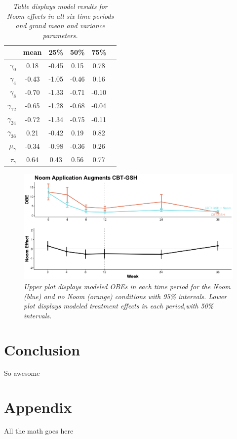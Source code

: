 \documentclass[12pt, oneside]{article}
\begin{document}
\begin{table}[t]
\centering
\begin{tabular}{r c c c c c}
  \hline
 & mean & 25\% & 50\% & 75\% \\ 
  \hline
  $\gamma_0$ & 0.18 & -0.45 & 0.15 & 0.78   \\ 
  $\gamma_4$ & -0.43 & -1.05 & -0.46 & 0.16   \\ 
  $\gamma_8$ & -0.70 & -1.33 & -0.71 & -0.10   \\  
  $\gamma_{12}$ & -0.65 & -1.28 & -0.68 & -0.04   \\  
  $\gamma_{24}$ & -0.72 & -1.34 & -0.75 & -0.11  \\  
  $\gamma_{36}$ & 0.21 & -0.42 & 0.19 & 0.82  \\ 
  \hline \hline
  $\mu_{\gamma}$ & -0.34 & -0.98 & -0.36 & 0.26  \\ 
  $\tau_{\gamma}$ & 0.64 & 0.43 & 0.56 & 0.77  \\ 
   \hline
\end{tabular}
\caption{\emph{Table displays model results for Noom effects in all six time periods and grand mean and variance parameters.}}
\end{table}


\begin{figure}[h]
\centering
\includegraphics[width=\textwidth, height=\textheight, keepaspectratio]{noom_effect.png}
\caption{\emph{Upper plot displays modeled OBEs in each time period for the Noom (blue) and no Noom (orange) conditions with 95\% intervals.  Lower plot displays modeled treatment effects in each period,with 50\% intervals.}}
\end{figure}


\section{Conclusion}
So awesome

\section{Appendix}
All the math goes here
\end{document}
